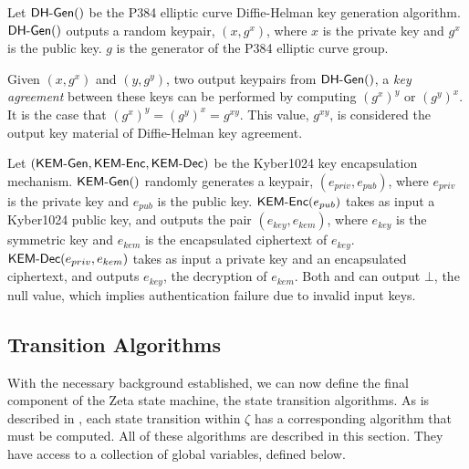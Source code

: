 \documentclass{article}
\begin{document}
\begin{definition}
	Let $\text{\sf DH-Gen}()$ be the P384 elliptic curve Diffie-Helman key generation algorithm. $\text{\sf DH-Gen}()$ outputs a random keypair, $(x, g^x)$, where $x$ is the private key and $g^x$ is the public key. $g$ is the generator of the P384 elliptic curve group.
\end{definition}

Given $(x, g^x)$ and $(y, g^y)$, two output keypairs from $\text{\sf DH-Gen}()$, a \emph{key agreement} between these keys can be performed by computing $(g^x)^y$ or $(g^y)^x$. It is the case that $(g^x)^y=(g^y)^x=g^{xy}$. This value, $g^{xy}$, is considered the output key material of Diffie-Helman key agreement.

\begin{definition}
	Let $(\text{\sf KEM-Gen}, \text{\sf KEM-Enc}, \text{\sf KEM-Dec})$ be the Kyber1024 key encapsulation mechanism. $\text{\sf KEM-Gen}()$ randomly generates a keypair, $(e_{priv}, e_{pub})$, where $e_{priv}$ is the private key and $e_{pub}$ is the public key. $\text{\sf KEM-Enc}(e_{pub})$ takes as input a Kyber1024 public key, and outputs the pair $(e_{key}, e_{kem})$, where $e_{key}$ is the symmetric key and $e_{kem}$ is the encapsulated ciphertext of $e_{key}$. $\text{\sf KEM-Dec}(e_{priv}, e_{kem})$ takes as input a private key and an encapsulated ciphertext, and outputs $e_{key}$, the decryption of $e_{kem}$. Both \KEMENC and \KEMDEC can output $\bot$, the null value, which implies authentication failure due to invalid input keys.
\end{definition}

\subsection{Transition Algorithms}\label{sec:trans_alg}

With the necessary background established, we can now define the final component of the Zeta state machine, the state transition algorithms. As is described in , each state transition within $\zeta$ has a corresponding algorithm that must be computed. All of these algorithms are described in this section. They have access to a collection of global variables, defined below.
\end{document}
